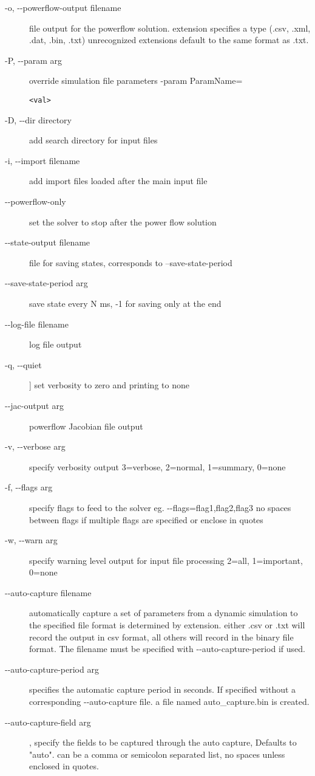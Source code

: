 \documentclass[12pt]{article} %
\begin{document}
    \begin{description}
    \item [-o, -{}-powerflow-output filename]  file output for the powerflow solution.  extension specifies a type (.csv, .xml, .dat, .bin, .txt)  unrecognized extensions default to the same format as .txt.
    \item [-P, -{}-param arg ]     override simulation file parameters -param ParamName=\begin{verbatim}<val>\end{verbatim}
    \item [-D, -{}-dir directory ]       add search directory for input files
    \item [-i, -{}-import filename ]           add import files loaded after the main input file
    \item [-{}-powerflow-only ]       set the solver to stop after the power flow solution
    \item [-{}-state-output filename ]     file for saving states, corresponds to --save-state-period
    \item [-{}-save-state-period arg] save state every N ms, -1 for saving only at the end
    \item [-{}-log-file filename]       log file output
    \item [ -q, -{}-quiet]  ]         set verbosity to zero and printing to none
    \item [-{}-jac-output arg ]       powerflow Jacobian file output
    \item [-v, -{}-verbose arg ]   specify verbosity output 3=verbose, 2=normal,
    1=summary, 0=none
    \item [-f, -{}-flags  arg  ]    specify flags to feed to the solver eg. -{}-flags=flag1,flag2,flag3 no spaces between flags if multiple flags are specified or enclose in quotes
    \item [-w, -{}-warn arg ]      specify warning level output for input file processing 2=all, 1=important, 0=none
    \item [-{}-auto-capture filename]  automatically capture a set of parameters from a dynamic simulation to the specified file format is determined by extension.  either .csv or .txt will record the output in csv format,  all others will record in the binary file format.  The filename must be specified with -{}-auto-capture-period if used.
    \item [-{}-auto-capture-period  arg ] specifies the automatic capture period in seconds.  If specified without a corresponding -{}-auto-capture file. a file named auto\_capture.bin is created.
    \item [-{}-auto-capture-field arg],  specify the fields to be captured through the auto capture,  Defaults to "auto".  can be a comma or semicolon separated list,  no spaces unless enclosed in quotes.
\end{description}
\end{document}
